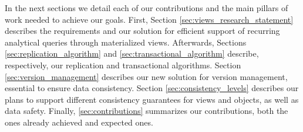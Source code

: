 In the next sections we detail each of our contributions and the main pillars of work needed to achieve our goals.
First, Section \ref{sec:views_research_statement} describes the requirements and our solution for efficient support of recurring analytical queries through materialized views.
Afterwards, Sections \ref{sec:replication_algorithm} and \ref{sec:transactional_algorithm} describe, respectively, our replication and transactional algorithms.
Section \ref{sec:version_management} describes our new solution for version management, essential to ensure data consistency.
Section \ref{sec:consistency_levels} describes our plans to support different consistency guarantees for views and objects, as well as data safety.
Finally, \ref{sec:contributions} summarizes our contributions, both the ones already achieved and expected ones.






